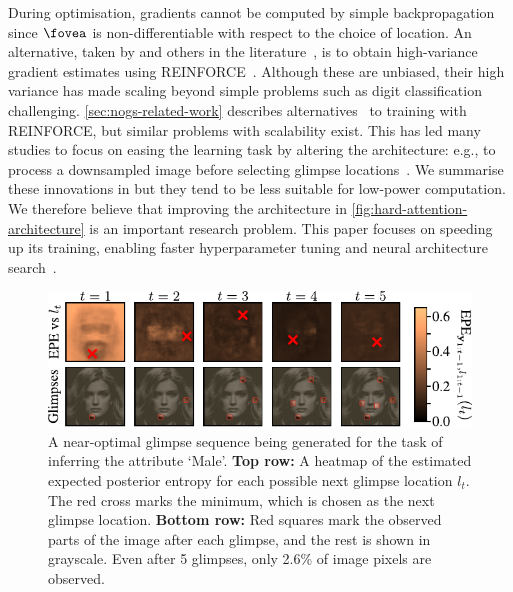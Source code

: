 During optimisation, gradients cannot be computed by simple backpropagation
since $\fovea$ is non-differentiable with respect to the choice of location. An
alternative, taken by \cite{mnih2014recurrent} and others in the
literature~\cite{ba2014multiple,sermanet2014attention}, is to obtain
high-variance gradient estimates using REINFORCE~\cite{williams1992simple}.
Although these are unbiased, their high variance has made scaling beyond simple
problems such as digit classification~\cite{netzer2011reading} challenging.
\cref{sec:nogs-related-work} describes
alternatives~\cite{ba2015learning,lawson2018learning} to training with
REINFORCE, but similar problems with scalability exist. This has led many
studies to focus on easing the learning task by altering the architecture: e.g.,
to process a downsampled image before selecting glimpse
locations~\cite{ba2014multiple,sermanet2014attention,katharopoulos2019processing}.
We summarise these innovations in  but they tend to be
less suitable for low-power computation.
%
We therefore believe that improving the architecture in
\cref{fig:hard-attention-architecture} is an important research problem. This
paper focuses on speeding up its training, enabling faster hyperparameter tuning
and neural architecture search~\cite{zoph2016neural}.

\begin{figure}
  \centering
  \includegraphics[scale=1]{figs/nogs/entropy-maps-2}
  \caption{A near-optimal glimpse sequence being generated for the task of
    inferring the attribute `Male'. \textbf{Top row:} A heatmap of the estimated
    expected posterior entropy for each possible next glimpse location $l_t$.
    The red cross marks the minimum, which is chosen as the next glimpse
    location. \textbf{Bottom row:} Red squares mark the observed parts of the
    image after each glimpse, and the rest is shown in grayscale. Even after 5
    glimpses, only 2.6\% of image pixels are observed. }
  \label{fig:epe-maps}
\end{figure}

